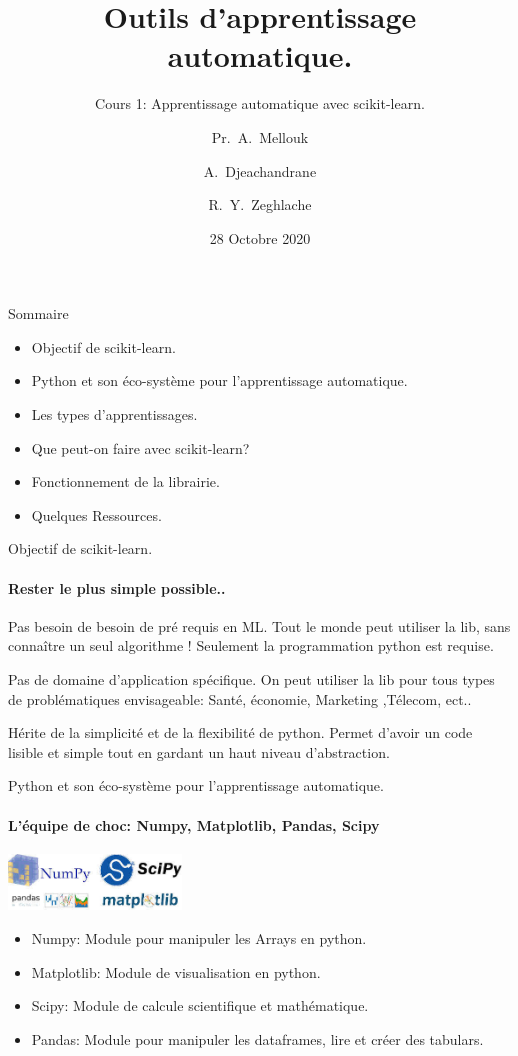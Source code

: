 \documentclass[9pt]{beamer}
\title{Outils d'apprentissage automatique.}
\subtitle{Cours 1: Apprentissage automatique avec scikit-learn.}
\author[Djeachandrane, Mellouk, Zeghlache] %
{Pr.~A.~Mellouk\inst{1} \and A.~Djeachandrane\inst{1} \and R.~Y.~Zeghlache\inst{1}}
\institute[EPISEN-ITS] %
{
  \inst{1}%
  EPISEN, LISSI, UPEC, Universite Paris-Est, 94400 Vitry sur Seine, France\\}
\date{28 Octobre 2020}
\begin{document}
\maketitle
\begin{frame}{Sommaire}
\begin{itemize}
\item Objectif de scikit-learn.
\item Python et son éco-système pour l'apprentissage automatique.
\item Les types d'apprentissages.
\item Que peut-on faire avec scikit-learn?
\item Fonctionnement de la librairie.
\item Quelques Ressources.


\end{itemize}
\end{frame}



\begin{frame}{Objectif de scikit-learn.}
\framesubtitle{Rester le plus simple possible..}
    \begin{block}{Pas besoin de besoin de pré requis en ML.
}    Tout le monde peut utiliser la lib, sans connaître un seul algorithme ! Seulement la programmation python est requise.
    \end{block}
    
    
    \begin{block}{Pas de domaine d'application spécifique.}
    On peut utiliser la lib pour tous types de problématiques envisageable: Santé, économie, Marketing ,Télecom, ect..
    \end{block}
    \begin{block}{Hérite de la simplicité et de la flexibilité de python.}
    Permet d'avoir un code lisible et simple tout en gardant un haut niveau d'abstraction.
    \end{block}
\end{frame}




\begin{frame}{Python et son éco-système pour l'apprentissage automatique.}
\framesubtitle{L'équipe de choc: Numpy, Matplotlib, Pandas, Scipy}

\includegraphics[height=1.5cm]{ecosystem.jpg}
   \begin{itemize}
       \item Numpy: Module pour manipuler les Arrays en python.
       \item Matplotlib: Module de visualisation en python.
       \item Scipy: Module de calcule scientifique et mathématique.
       \item Pandas: Module pour manipuler les dataframes, lire et créer des tabulars.
\end{itemize}
\end{frame}
\end{document}
